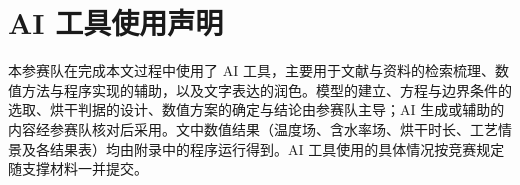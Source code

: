 \section*{AI 工具使用声明}

本参赛队在完成本文过程中使用了 AI 工具，主要用于文献与资料的检索梳理、数值方法与程序实现的辅助，以及文字表达的润色。模型的建立、方程与边界条件的选取、烘干判据的设计、数值方案的确定与结论由参赛队主导；AI 生成或辅助的内容经参赛队核对后采用。文中数值结果（温度场、含水率场、烘干时长、工艺情景及各结果表）均由附录中的程序运行得到。AI 工具使用的具体情况按竞赛规定\cite{mcmrule}随支撑材料一并提交。
